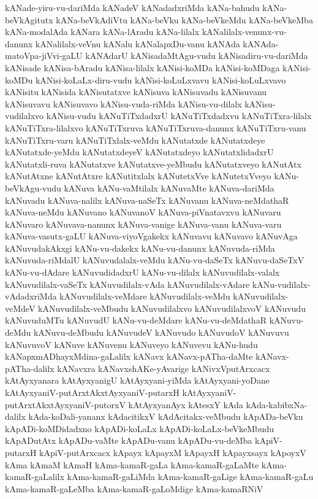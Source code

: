 {kANade-yiru-vu-dariMda
kANadeV
kANadadxriMda
kANa-bahudu
kANa-beVkAgitutx
kANa-beVkAdiVtu
kANa-beVku
kANa-beVkeMdu
kANa-beVkeMba
kANa-modalAda
kANara
kANa-lAradu
kANa-lilalx
kANalilalx-venunx-vu-danunx
kANalilalx-veVnu
kANalu
kANalapxDu-vanu
kANAda
kANAda-matoVpa-jiVvi-gaLU
kANAdarU
kANisadaMtAgu-vudu
kANisadiru-vu-dariMda
kANisade
kANisa-bAradu
kANisa-lilalx
kANisi-koMDa
kANisi-koMDaga
kANisi-koMDu
kANisi-koLaLx-diru-vudu
kANisi-koLuLxvavu
kANisi-koLuLxvavo
kANisitu
kANisida
kANisutatxve
kANisuva
kANisuvadu
kANisuvanu
kANisuvavu
kANisuvavo
kANisu-vuda-riMda
kANisu-vu-dilalx
kANisu-vudilalxvo
kANisu-vudu
kANuTiTxdadxrU
kANuTiTxdadxvu
kANuTiTxra-lilalx
kANuTiTxra-lilalxvo
kANuTiTxruva
kANuTiTxruva-danunx
kANuTiTxru-vanu
kANuTiTxru-varu
kANuTiTxlalx-veMdu
kANutatxde
kANutatxdeye
kANutatxde-yeMdu
kANutatxdeyeV
kANutatxdeyo
kANutatxlidadxrU
kANutatxli-ruva
kANutatxve
kANutatxve-yeMbudu
kANutatxveyo
kANutAtx
kANutAtxne
kANutAtxre
kANutitxlalx
kANutetxVve
kANutetxVveyo
kANu-beVkAgu-vudu
kANuva
kANu-vaMtilalx
kANuvaMte
kANuva-dariMda
kANuvadu
kANuva-nalilx
kANuva-naSeTx
kANuvanu
kANuva-neMdathaR
kANuva-neMdu
kANuvano
kANuvanoV
kANuva-piVnatavxvu
kANuvaru
kANuvaro
kANuvava-nanunx
kANuva-vanige
kANuva-vanu
kANuva-varu
kANuva-vasutx-gaLU
kANuva-viyoVgakekx
kANuvavu
kANuvavo
kANuvAga
kANuvudakAkxgi
kANu-vu-dakekx
kANu-vu-danunx
kANuvuda-riMda
kANuvuda-riMdalU
kANuvudalalx-veMdu
kANu-vu-daSeTx
kANuvu-daSeTxV
kANu-vu-dAdare
kANuvudidadxrU
kANu-vu-dilalx
kANuvudilalx-valalx
kANuvudilalx-vaSeTx
kANuvudilalx-vAda
kANuvudilalx-vAdare
kANu-vudilalx-vAdadxriMda
kANuvudilalx-veMdare
kANuvudilalx-veMdu
kANuvudilalx-veMdeV
kANuvudilalx-veMbudu
kANuvudilalxvo
kANuvudilalxvoV
kANuvudu
kANuvuduMTu
kANuvudU
kANu-vu-deMdare
kANu-vu-deMdathaR
kANuvu-deMdu
kANuvu-deMbudu
kANuvudeV
kANuvudo
kANuvudoV
kANuvuvu
kANuvuvoV
kANuve
kANuvenu
kANuveyo
kANuvevu
kANu-hudu
kANapxmADhayxMdina-gaLalilx
kANavx
kANavx-pATha-daMte
kANavx-pATha-dalilx
kANavxra
kANavxshAKe-yAvarige
kANivxVputArxcacx
kAtAyxyanara
kAtAyxyanigU
kAtAyxyani-yiMda
kAtAyxyani-yoDane
kAtAyxyaniV-putArxtAkxtAyxyaniV-putarxH
kAtAyxyaniV-putArxtAkxtAyxyaniV-putorxV
kAtAyxyanAyx
kAtesxY
kAda
kAda-kabibxNa-dalilx
kAda-koDali-yananx
kAdacitikxV
kAdAcitakx-veMbudu
kApADa-beVku
kApADi-koMDidadxno
kApADi-koLaLx
kApADi-koLaLx-beVkeMbudu
kApADutAtx
kApADu-vaMte
kApADu-vanu
kApADu-vu-deMba
kApiV-putarxH
kApiV-putArxcacx
kApayx
kApayxM
kApayxH
kApayxsayx
kApoyxV
kAma
kAmaM
kAmaH
kAma-kamaR-gaLa
kAma-kamaR-gaLaMte
kAma-kamaR-gaLalilx
kAma-kamaR-gaLiMda
kAma-kamaR-gaLige
kAma-kamaR-gaLu
kAma-kamaR-gaLeMba
kAma-kamaR-gaLoMdige
kAma-kamaRNiV
}
